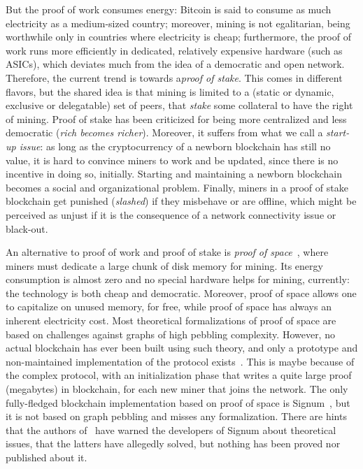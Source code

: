 But the proof of work consumes energy: Bitcoin is said to consume as much electricity as
a medium-sized country; moreover, mining is not egalitarian, being
worthwhile only in countries where electricity is cheap; furthermore, the proof of work
runs more efficiently in dedicated, relatively expensive hardware (such as ASICs),
which deviates much from the idea of a democratic and open network.
Therefore, the current trend is towards a\emph{proof of stake}.
This comes in different flavors, but
the shared idea is that mining is limited to a (static or dynamic, exclusive or delegatable)
set of peers, that \emph{stake} some collateral to have the right of mining.
Proof of stake has been criticized for being more centralized and less democratic
(\emph{rich becomes richer}).
Moreover, it suffers from what we call a \emph{start-up issue}: as long as the cryptocurrency
of a newborn blockchain has still no value, it is hard to convince miners to work and
be updated, since there is no incentive in doing so, initially. Starting and maintaining
a newborn blockchain becomes a social and organizational problem. Finally, miners in
a proof of stake blockchain get punished (\emph{slashed}) if they misbehave or are offline, which
might be perceived as unjust if it is the consequence of a network connectivity issue or black-out.

An alternative to proof of work and proof of stake is
\emph{proof of space}~\cite{AtenieseBFG14,DziembowskiFKP15}, where
miners must dedicate a large chunk of disk memory for mining.
Its energy consumption is almost zero and no special
hardware helps for mining, currently: the technology is both cheap
and democratic. Moreover, proof of space allows
one to capitalize on unused memory, for free, while proof of space has always an
inherent electricity cost. Most theoretical formalizations of proof of space are
based on challenges against graphs of high pebbling complexity. However, no actual blockchain
has ever been built using such theory, and only a prototype and non-maintained
implementation of the protocol exists~\cite{ParkKFGAP18}. This is maybe because of the
complex protocol, with an initialization phase
that writes a quite large proof (megabytes) in blockchain,
for each new miner that joins the network.
The only fully-fledged blockchain
implementation based on proof of space is Signum~\cite{Signum}, but it is not
based on graph pebbling and misses any formalization.
There are hints that the authors of~\cite{ParkKFGAP18} have warned the developers of Signum about
theoretical issues, that the latters have allegedly solved,
but nothing has been proved nor published about it.

